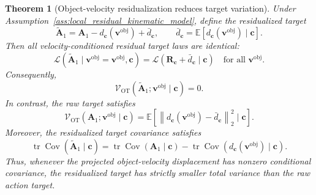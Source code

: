 \documentclass[10pt,twocolumn,letterpaper]{article}
\newtheorem{theorem}{Theorem}
\begin{document}
\begin{theorem}[Object-velocity residualization reduces target variation]
\label{thm:velocity_residualization_reduces_variation}
Under Assumption~\ref{ass:local_residual_kinematic_model}, define the
residualized target
\begin{equation}
    \widetilde{\mathbf A}_1
    =
    \mathbf A_1
    -
    d_{\mathbf c}(\mathbf v^{\mathrm{obj}})
    +
    \bar d_{\mathbf c},
    \qquad
    \bar d_{\mathbf c}
    =
    \mathbb E
    [
        d_{\mathbf c}(\mathbf v^{\mathrm{obj}})
        \mid
        \mathbf c
    ].
    \label{eq:residualized_target_variance_analysis}
\end{equation}
Then all velocity-conditioned residual target laws are identical:
\begin{equation}
    \mathcal L
    \left(
        \widetilde{\mathbf A}_1
        \mid
        \mathbf v^{\mathrm{obj}}=\mathbf v^{\mathrm{obj}},
        \mathbf c
    \right)
    =
    \mathcal L
    \left(
        \mathbf R_{\mathbf c}
        +
        \bar d_{\mathbf c}
        \mid
        \mathbf c
    \right)
    \quad
    \text{for all } \mathbf v^{\mathrm{obj}}.
    \label{eq:residual_laws_identical}
\end{equation}
Consequently,
\begin{equation}
    \mathcal V_{\mathrm{OT}}
    (
        \widetilde{\mathbf A}_1;
        \mathbf v^{\mathrm{obj}}
        \mid
        \mathbf c
    )
    =
    0.
    \label{eq:residual_ot_zero}
\end{equation}
In contrast, the raw target satisfies
\begin{equation}
    \mathcal V_{\mathrm{OT}}
    (
        \mathbf A_1;
        \mathbf v^{\mathrm{obj}}
        \mid
        \mathbf c
    )
    =
    \mathbb E
    \left[
        \left\|
            d_{\mathbf c}(\mathbf v^{\mathrm{obj}})
            -
            \bar d_{\mathbf c}
        \right\|_2^2
        \mid
        \mathbf c
    \right].
    \label{eq:ot_variability_value}
\end{equation}
Moreover, the residualized target covariance satisfies
\begin{equation}
    \operatorname{tr}
    \operatorname{Cov}
    (
        \widetilde{\mathbf A}_1
        \mid
        \mathbf c
    )
    =
    \operatorname{tr}
    \operatorname{Cov}
    (
        \mathbf A_1
        \mid
        \mathbf c
    )
    -
    \operatorname{tr}
    \operatorname{Cov}
    (
        d_{\mathbf c}(\mathbf v^{\mathrm{obj}})
        \mid
        \mathbf c
    ).
    \label{eq:covariance_reduction}
\end{equation}
Thus, whenever the projected object-velocity displacement has nonzero
conditional covariance, the residualized target has strictly smaller total
variance than the raw action target.
\end{theorem}
\end{document}
